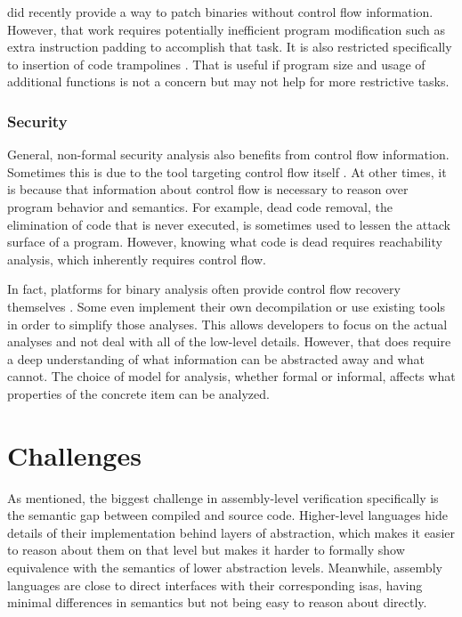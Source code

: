 \Textcite{duck2020binary} did recently provide a way to patch binaries without control flow information.
However, that work requires potentially inefficient program modification such as extra instruction padding to accomplish that task.
It is also restricted specifically to insertion of code trampolines \autocite{baker1995cons}.
That is useful if program size and usage of additional functions is not a concern but may not help for more restrictive tasks.

\subsubsection{Security}
General, non-formal security analysis also benefits from control flow information.
Sometimes this is due to the tool targeting control flow itself \autocite{kruegel2005automating,davi2009dynamic}.
At other times, it is because that information about control flow is necessary to reason over program behavior and semantics.
For example, dead code removal, the elimination of code that is never executed, is sometimes used to lessen the attack surface of a program.
However, knowing what code is dead requires reachability analysis, which inherently requires control flow.

In fact, platforms for binary analysis often provide control flow recovery themselves \autocite{song2008bitblaze,wang2017angr}.
Some even implement their own decompilation or use existing tools in order to simplify those analyses.
This allows developers to focus on the actual analyses and not deal with all of the low-level details.
However, that does require a deep understanding of what information can be abstracted away and what cannot.
The choice of model for analysis, whether formal or informal, affects what properties of the concrete item can be analyzed.

\section{Challenges}\label{challenges}
As mentioned, the biggest challenge in assembly-level verification specifically is the semantic gap between compiled and source code.
Higher-level languages hide details of their implementation behind layers of abstraction, which makes it easier to reason about them on that level but makes it harder to formally show equivalence with the semantics of lower abstraction levels.
Meanwhile, assembly languages are close to direct interfaces with their corresponding \acp{isa}, having minimal differences in semantics but not being easy to reason about directly.

